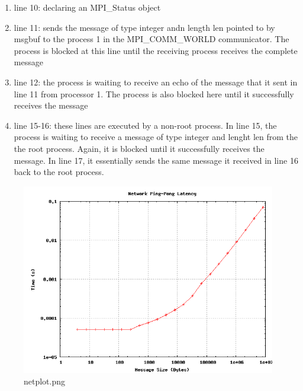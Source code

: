 \begin{itemize}
\begin{enumerate}
		\item line 10: declaring an MPI\_Status object
		\item line 11: sends the message of type integer andn length len pointed to by msgbuf to the process 1 in the MPI\_COMM\_WORLD communicator. The process is blocked at this line until the receiving process receives the complete message
		\item line 12: the process is waiting to receive an echo of the message that it sent in line 11 from processor 1. The process is also blocked here until it successfully receives the message
		\item line 15-16: these lines are executed by a non-root process. In line 15, the process is waiting to receive a message of type integer and lenght len from the the root process. Again, it is blocked until it successfully receives the message. In line 17, it essentially sends the same message it received in line 16 back to the root process.
	\end{enumerate}
	
\end{itemize}

\begin{figure}[htbp]
	\begin{center}
		\includegraphics[width=0.99\textwidth]{pics/netplot.png}
	\end{center}%
	\caption{netplot.png
	}
	\label{fig: netplot}
\end{figure}%

